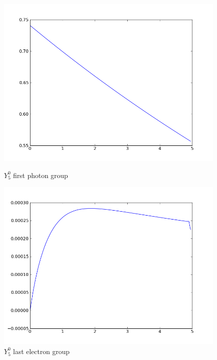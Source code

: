 \begin{figure}[H]
\begin{minipage}[b]{0.45\linewidth}
\centering
\includegraphics[width=\linewidth]{./images/al/group_0_moment_30}
\caption{$Y_5^0$ first photon group}
\end{minipage}
\hspace{0.5cm}
\begin{minipage}[b]{0.45\linewidth}
\centering
\includegraphics[width=\linewidth]{./images/al/group_39_moment_30}
\caption{$Y_5^0$ last electron group}
\end{minipage}
\end{figure}

